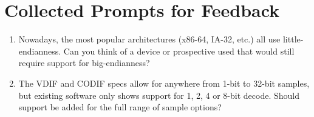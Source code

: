 \documentclass[11pt]{article}
\begin{document}
\section{Collected Prompts for Feedback}

\begin{enumerate}
	\item Nowadays, the most popular architectures (x86-64, IA-32, etc.) all use little-endianness. Can you think of a device or prospective used that would still require support for big-endianness?
	\item The VDIF and CODIF specs allow for anywhere from 1-bit to 32-bit samples, but existing software only shows support for 1, 2, 4 or 8-bit decode. Should support be added for the full range of sample options?
\end{enumerate}

	
\end{document}
